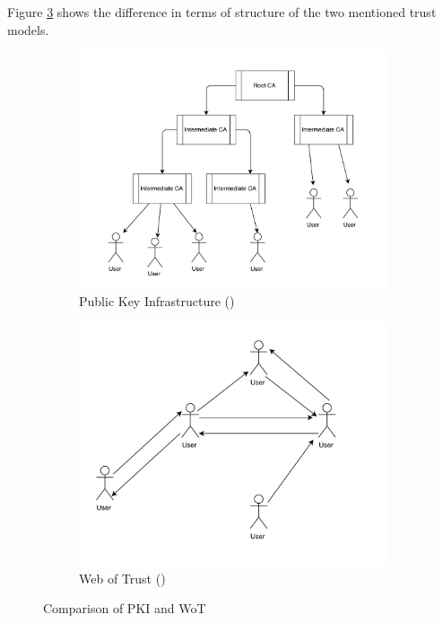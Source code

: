Figure \ref{fig:pkiwot} shows the difference in terms of structure of the two mentioned trust models.

\begin{figure}
	\centering
	\begin{subfigure}{.5\textwidth}
		\centering
		\includegraphics[width=1\linewidth]{figures/PKI}
		\caption{ Public Key Infrastructure ()}
		\label{fig:pki}
	\end{subfigure}%
	\begin{subfigure}{.5\textwidth}
		\centering
		\includegraphics[width=1\linewidth]{figures/WOT}
		\caption{ Web of Trust ()}
		\label{fig:wot}
	\end{subfigure}
	\caption{Comparison of PKI and WoT}
	\label{fig:pkiwot}
\end{figure}



